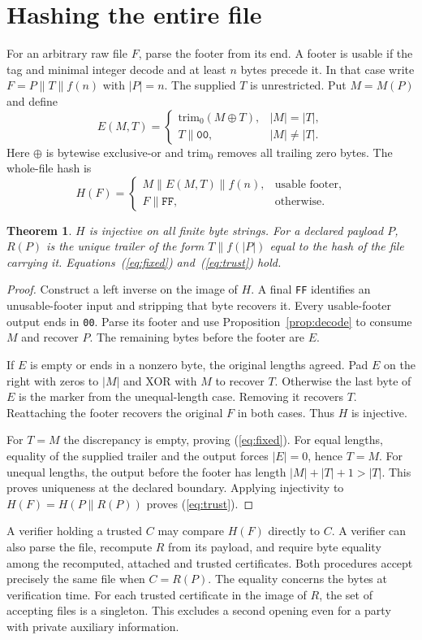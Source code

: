 \documentclass[10pt,twocolumn,letterpaper]{article}
\newtheorem{theorem}{Theorem}
\newcommand{\cat}{\mathbin{\|}}
\newcommand{\byte}[1]{\texttt{#1}}
\newcommand{\len}[1]{\lvert #1\rvert}
\begin{document}
\section{Hashing the entire file}
For an arbitrary raw file \(F\), parse the footer from its end. A footer is usable if the tag and minimal integer decode and at least \(n\) bytes precede it. In that case write \(F=P\cat T\cat f(n)\) with \(\len{P}=n\). The supplied \(T\) is unrestricted. Put \(M=M(P)\) and define
\[
 E(M,T)=
 \begin{cases}
 \mathrm{trim}_0(M\mathbin{\oplus}T),&\len M=\len T,\\
 T\cat\byte{00},&\len M\ne\len T .
 \end{cases}
\]
Here \(\oplus\) is bytewise exclusive-or and \(\mathrm{trim}_0\) removes all trailing zero bytes. The whole-file hash is
\[
 H(F)=
 \begin{cases}
 M\cat E(M,T)\cat f(n),&\text{usable footer},\\
 F\cat\byte{FF},&\text{otherwise}.
 \end{cases}
\]

\begin{theorem}\label{thm:exact}
\(H\) is injective on all finite byte strings. For a declared payload \(P\), \(R(P)\) is the unique trailer of the form \(T\cat f(\len P)\) equal to the hash of the file carrying it. Equations~(\ref{eq:fixed}) and~(\ref{eq:trust}) hold.
\end{theorem}
\begin{proof}
Construct a left inverse on the image of \(H\). A final \byte{FF} identifies an unusable-footer input and stripping that byte recovers it. Every usable-footer output ends in \byte{00}. Parse its footer and use Proposition~\ref{prop:decode} to consume \(M\) and recover \(P\). The remaining bytes before the footer are \(E\).

If \(E\) is empty or ends in a nonzero byte, the original lengths agreed. Pad \(E\) on the right with zeros to \(\len M\) and XOR with \(M\) to recover \(T\). Otherwise the last byte of \(E\) is the marker from the unequal-length case. Removing it recovers \(T\). Reattaching the footer recovers the original \(F\) in both cases. Thus \(H\) is injective.

For \(T=M\) the discrepancy is empty, proving (\ref{eq:fixed}). For equal lengths, equality of the supplied trailer and the output forces \(\len E=0\), hence \(T=M\). For unequal lengths, the output before the footer has length \(\len M+\len T+1>\len T\). This proves uniqueness at the declared boundary. Applying injectivity to \(H(F)=H(P\cat R(P))\) proves (\ref{eq:trust}).
\end{proof}
A verifier holding a trusted \(C\) may compare \(H(F)\) directly to \(C\). A verifier can also parse the file, recompute \(R\) from its payload, and require byte equality among the recomputed, attached and trusted certificates. Both procedures accept precisely the same file when \(C=R(P)\). The equality concerns the bytes at verification time. For each trusted certificate in the image of \(R\), the set of accepting files is a singleton. This excludes a second opening even for a party with private auxiliary information.
\end{document}
